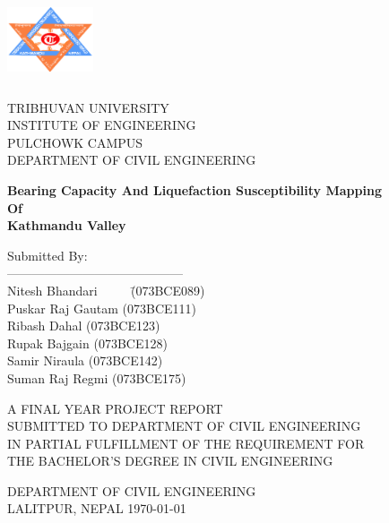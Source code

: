 \begin{titlepage}
	\centering
	\includegraphics[height=1in,width=1in]{images/main/logo.png}
	\par
	\begin{large}
		TRIBHUVAN UNIVERSITY\\
		INSTITUTE OF ENGINEERING\\
		PULCHOWK CAMPUS\\
		DEPARTMENT OF CIVIL ENGINEERING
	\end{large}
	\vfill
	\begin{Large}\bfseries
		Bearing Capacity And Liquefaction Susceptibility Mapping\\
		Of \\
		Kathmandu Valley
	\end{Large}
	\vfill
	\begin{minipage}[t]{0.48\linewidth}
		\vspace{0pt}
		 \begin{tabbing}
			Submitted By:\\
			------------------------------------------\\
			Nitesh Bhandari ~~~~ \=  (073BCE089)\\
			Puskar Raj Gautam \>  (073BCE111)\\
			Ribash Dahal \>  (073BCE123)\\
			Rupak Bajgain \> (073BCE128)\\
			Samir Niraula \> (073BCE142)\\
			Suman Raj Regmi \> (073BCE175)
		\end{tabbing}
	\end{minipage}
	\vfill
		\center
		A FINAL YEAR PROJECT REPORT\\
		SUBMITTED TO DEPARTMENT OF CIVIL ENGINEERING\\
		IN PARTIAL FULFILLMENT OF THE REQUIREMENT FOR\\
		THE BACHELOR’S DEGREE IN CIVIL ENGINEERING
		\vfill
		\par
		DEPARTMENT OF CIVIL ENGINEERING\\
		LALITPUR, NEPAL
	\vfill
	\today
\end{titlepage}